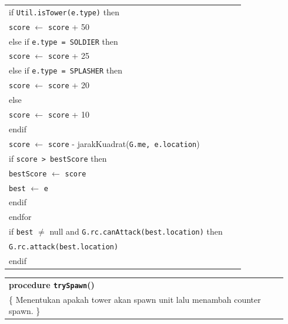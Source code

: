 \documentclass{article}
\newenvironment{pseudobox}
{
\centering
\begin{longtable}{|p{0.94\linewidth}|}
\hline
}
{
\\ \hline
\end{longtable}
\vspace{0.05cm}
}
\begin{document}
\begin{enumerate}[label=\alph*.]
\begin{enumerate}[label=\alph*.]
\begin{pseudobox}
\hspace*{3em}if \texttt{Util.isTower(e.type)} then \\
\hspace*{4.5em}\texttt{score} $\leftarrow$ \texttt{score} + 50 \\
\hspace*{3em}else if \texttt{e.type = SOLDIER} then \\
\hspace*{4.5em}\texttt{score} $\leftarrow$ \texttt{score} + 25 \\
\hspace*{3em}else if \texttt{e.type = SPLASHER} then \\
\hspace*{4.5em}\texttt{score} $\leftarrow$ \texttt{score} + 20 \\
\hspace*{3em}else \\
\hspace*{4.5em}\texttt{score} $\leftarrow$ \texttt{score} + 10 \\
\hspace*{3em}endif \\

\hspace*{3em}\texttt{score} $\leftarrow$ \texttt{score} - jarakKuadrat(\texttt{G.me, e.location}) \\

\hspace*{3em}if \texttt{score > bestScore} then \\
\hspace*{4.5em}\texttt{bestScore} $\leftarrow$ \texttt{score} \\
\hspace*{4.5em}\texttt{best} $\leftarrow$ \texttt{e} \\
\hspace*{3em}endif \\
\hspace*{1.5em}endfor \\

\hspace*{1.5em}if \texttt{best} $\neq$ null and \texttt{G.rc.canAttack(best.location)} then \\
\hspace*{3em}\texttt{G.rc.attack(best.location)} \\
\hspace*{1.5em}endif
\end{pseudobox}

\begin{pseudobox}
\textbf{procedure \texttt{trySpawn}()} \\
\{ Menentukan apakah tower akan spawn unit lalu menambah counter spawn. \}


\end{pseudobox}
\end{enumerate}
\end{enumerate}
\end{document}
